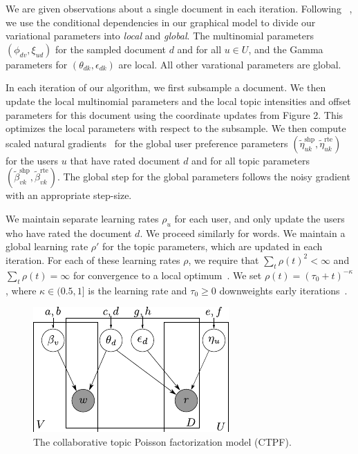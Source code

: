 \documentclass{article}
\newcommand{\shape}{\textrm{shp}}
\newcommand{\rate}{\textrm{rte}}
\newcommand{\vshape}[2]{\tilde{#1}_{#2}^{\shape}}
\newcommand{\vrate}[2]{\tilde{#1}_{#2}^{\rate}}
\begin{document}
We are given observations about a single document in each iteration.  Following
~\cite{Hoffman:2013}, we use the conditional dependencies in our graphical
model to divide our variational parameters into \emph{local} and
\emph{global}. The multinomial parameters $(\phi_{dv}, \xi_{ud})$ for the
sampled document $d$ and for all $u \in U$, and the Gamma parameters for
$(\theta_{dk}, \epsilon_{dk})$ are local. All other varational parameters are
global.

In each iteration of our algorithm, we first subsample a document. We then
update the local multinomial parameters and the local topic intensities and
offset parameters for this document using the coordinate updates from
Figure 2. 
This optimizes the local parameters with respect to the
subsample. We then compute scaled natural gradients~\cite{Amari:1982} for the
global user preference parameters $(\vshape{\eta}{uk}, \vrate{\eta}{uk})$ for the
users $u$ that have rated document $d$ and for all topic parameters
$(\vshape{\beta}{vk}, \vrate{\beta}{vk})$. The global step for the global
parameters follows the noisy gradient with an appropriate step-size. 

We maintain separate learning rates $\rho_u$ for each user, and only update the
users who have rated the document $d$. We proceed similarly for words. We maintain a global learning rate
$\rho'$ for the topic parameters, which are updated in each iteration.  For
each of these learning rates $\rho$, we require that $\sum_{t} \rho(t)^2 <
\infty$ and $\sum_{t} \rho(t) = \infty$ for convergence to a local
optimum~\citep{Robbins:1951}. We set $\rho(t) = (\tau_0 + t)^{-\kappa}$, where
$\kappa \in (0.5,1]$ is the learning rate and $\tau_0 \geq 0$ downweights early
  iterations~\cite{Hoffman:2013}. 

\begin{figure}
\begin{center}
 \includegraphics{../fig/pdf/graphical_model}
 \caption{The collaborative topic Poisson factorization model (CTPF).}
 \label{fig:graphical_model}
 \end{center}
\end{figure}
\end{document}
